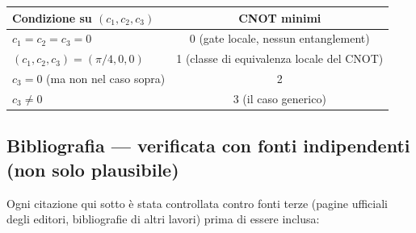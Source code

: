 \documentclass[11pt,a4paper]{article}
\begin{document}
\begin{center}
\renewcommand{\arraystretch}{1.25}
\begin{tabular}{@{}lc@{}}
\toprule
\rowcolor{inkblue!10}
\textbf{Condizione su $(c_1,c_2,c_3)$} & \textbf{CNOT minimi}\\
\midrule
$c_1=c_2=c_3=0$ & 0 (gate locale, nessun entanglement)\\
$(c_1,c_2,c_3)=(\pi/4,0,0)$ & 1 (classe di equivalenza locale del CNOT)\\
$c_3=0$ (ma non nel caso sopra) & 2\\
$c_3\neq0$ & 3 (il caso generico)\\
\bottomrule
\end{tabular}
\end{center}

\subsection*{Bibliografia --- verificata con fonti indipendenti (non solo plausibile)}

Ogni citazione qui sotto è stata controllata contro fonti terze
(pagine ufficiali degli editori, bibliografie di altri lavori) prima
di essere inclusa:
\end{document}

